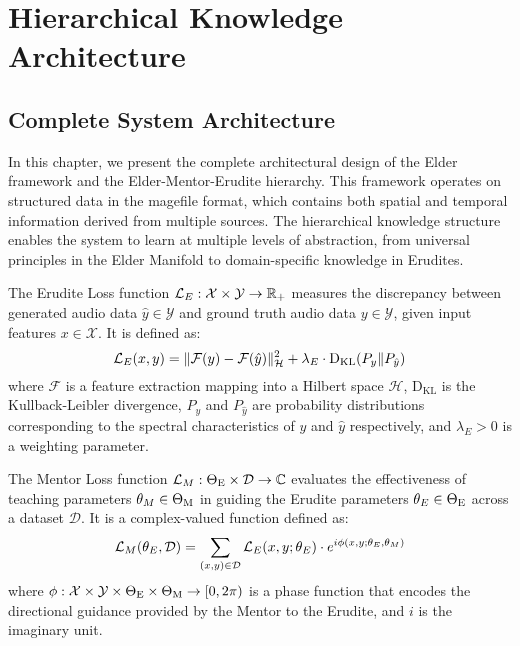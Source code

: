 \chapter{Hierarchical Knowledge Architecture}

\section{Complete System Architecture}

In this chapter, we present the complete architectural design of the Elder framework and the Elder-Mentor-Erudite hierarchy. This framework operates on structured data in the magefile format, which contains both spatial and temporal information derived from multiple sources. The hierarchical knowledge structure enables the system to learn at multiple levels of abstraction, from universal principles in the Elder Manifold to domain-specific knowledge in Erudites.

\begin{definition}
The Erudite Loss function $\mathcal{L}_E: \mathcal{X} \times \mathcal{Y} \rightarrow \mathbb{R}_+$ measures the discrepancy between generated audio data $\hat{y} \in \mathcal{Y}$ and ground truth audio data $y \in \mathcal{Y}$, given input features $x \in \mathcal{X}$. It is defined as:
\begin{equation}
\mathcal{L}_E(x, y) = \| \mathcal{F}(y) - \mathcal{F}(\hat{y}) \|_{\mathcal{H}}^2 + \lambda_E \cdot \mathrm{D_{KL}}(P_y \| P_{\hat{y}})
\end{equation}
where $\mathcal{F}$ is a feature extraction mapping into a Hilbert space $\mathcal{H}$, $\mathrm{D_{KL}}$ is the Kullback-Leibler divergence, $P_y$ and $P_{\hat{y}}$ are probability distributions corresponding to the spectral characteristics of $y$ and $\hat{y}$ respectively, and $\lambda_E > 0$ is a weighting parameter.
\end{definition}

\begin{definition}
The Mentor Loss function $\mathcal{L}_M: \Theta_{\text{E}} \times \mathcal{D} \rightarrow \mathbb{C}$ evaluates the effectiveness of teaching parameters $\theta_M \in \Theta_{\text{M}}$ in guiding the Erudite parameters $\theta_E \in \Theta_{\text{E}}$ across a dataset $\mathcal{D}$. It is a complex-valued function defined as:
\begin{equation}
\mathcal{L}_M(\theta_E, \mathcal{D}) = \sum_{(x,y) \in \mathcal{D}} \mathcal{L}_E(x, y; \theta_E) \cdot e^{i\phi(x,y;\theta_E,\theta_M)}
\end{equation}
where $\phi: \mathcal{X} \times \mathcal{Y} \times \Theta_{\text{E}} \times \Theta_{\text{M}} \rightarrow [0, 2\pi)$ is a phase function that encodes the directional guidance provided by the Mentor to the Erudite, and $i$ is the imaginary unit.
\end{definition}


